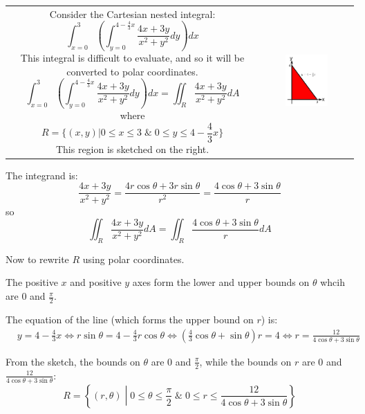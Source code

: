 \documentclass{article}
\begin{document}
\begin{tabular}{cc}
\parbox{0.5\textwidth}{
Consider the Cartesian nested integral:
\[\int_{x = 0}^3 \left(\int_{y = 0}^{4 - \frac{4}{3}x} \frac{4x + 3y}{x^2 + y^2} dy\right)dx\] 
This integral is difficult to evaluate, and so it will be converted to polar coordinates. 
\[\int_{x = 0}^3 \left(\int_{y = 0}^{4 - \frac{4}{3}x} \frac{4x + 3y}{x^2 + y^2} dy\right)dx = \iint_R \frac{4x + 3y}{x^2 + y^2} dA\] 
where 
\[R = \{(x,y)| 0 \leq x \leq 3 \;\&\; 0 \leq y \leq 4 - \frac{4}{3}x\}\]
This region is sketched on the right.
} & \parbox{0.5\textwidth}{
\includegraphics[width = 0.5\textwidth]{Polar_region_4}
}
\end{tabular}

The integrand is:
\[\frac{4x + 3y}{x^2 + y^2} 
= \frac{4r\cos\theta + 3r\sin\theta}{r^2}
= \frac{4\cos\theta + 3\sin\theta}{r}\]
so
\[\iint_R \frac{4x + 3y}{x^2 + y^2} dA = \iint_R \frac{4\cos\theta + 3\sin\theta}{r} dA\]

Now to rewrite \(R\) using polar coordinates. 

The positive \(x\) and positive \(y\) axes form the lower and upper bounds on \(\theta\) whcih are \(0\) and \(\frac{\pi}{2}\).

The equation of the line (which forms the upper bound on \(r\)) is:
\begin{align*}
& y = 4 - \frac{4}{3}x   
\iff r\sin\theta = 4 - \frac{4}{3}r\cos\theta 
\iff (\frac{4}{3}\cos\theta + \sin\theta)r = 4 
\iff r = \frac{12}{4\cos\theta + 3\sin\theta} 
\end{align*}     

From the sketch, the bounds on \(\theta\) are \(0\) and \(\frac{\pi}{2}\), while the bounds on \(r\) are \(0\) and \(\frac{12}{4\cos\theta + 3\sin\theta}\):
\[R = \left\{(r,\theta)\middle| 0 \leq \theta \leq \frac{\pi}{2} \;\&\; 0 \leq r \leq \frac{12}{4\cos\theta + 3\sin\theta}\right\}\]
\end{document}
